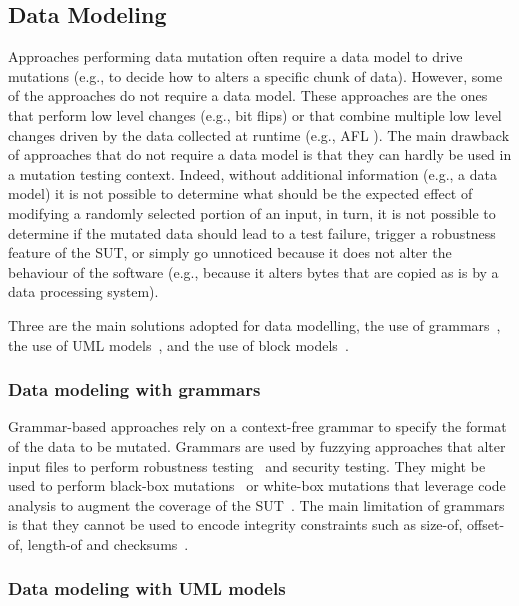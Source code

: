 
\subsection{Data Modeling}
\label{sec:dataModeling}

Approaches performing data mutation often require a data model to drive mutations (e.g., to decide how to alters a specific chunk of data). 
However, some of the approaches do not require a data model. 
These approaches are the ones that perform low level changes (e.g., bit flips) or that combine multiple low level changes driven by the data collected at runtime (e.g., AFL ).
The main drawback of approaches that do not require a data model is that they can hardly be used in a mutation testing context.
Indeed, without additional information (e.g., a data model) it is not possible to determine what should be the expected effect of modifying a randomly selected portion of an input, in turn, it is not possible to determine if the mutated data should lead to a test failure, trigger a robustness feature of the SUT, or simply go unnoticed because it does not alter the behaviour of the software (e.g., because it alters bytes that are copied as is by a data processing system).

Three are the main solutions adopted for data modelling, the use of grammars~\cite{ghosh1998testing,Godefroid:GrammarBasedFuzzying:2008,godefroid2012sage,bounimova2013billions}, the use of UML models~\cite{di2015evolutionary}, and the use of block models~\cite{pham2016model,PeachFuzzer}.

\subsubsection{Data modeling with grammars}

Grammar-based approaches rely on a context-free grammar to specify the format of the data to be mutated. Grammars are used by fuzzying approaches that alter input files to perform robustness testing~\cite{ghosh1998testing} and security testing. They might be used to perform black-box mutations~\cite{ghosh1998testing} or white-box mutations that leverage code analysis to augment the coverage of the SUT~\cite{Godefroid:GrammarBasedFuzzying:2008}.
The main limitation of grammars is that they cannot be used to encode integrity constraints such as size-of, offset-of, length-of and checksums~\cite{pham2016model}. 

\subsubsection{Data modeling with UML models}

